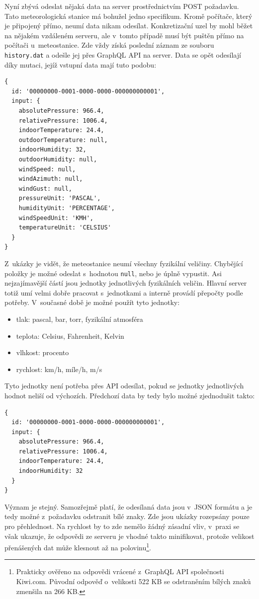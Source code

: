 Nyní zbývá odeslat nějaká data na server prostřednictvím POST po\-ža\-dav\-ku. Tato meteorologická stanice má bohužel jedno specifikum. Kromě počítače, který je připojený přímo, neumí data nikam odesílat. Konkretizační uzel by mohl běžet na nějakém vzdáleném serveru, ale v~tomto případě musí být puštěn přímo na počítači u~meteostanice. Zde vždy získá poslední záznam ze souboru \texttt{history.dat} a odešle jej přes GraphQL API na server. Data se opět odesílají díky mutaci, jejíž vstupní data mají tuto podobu:

\begin{verbatim}
{
  id: '00000000-0001-0000-0000-000000000001',
  input: {
    absolutePressure: 966.4,
    relativePressure: 1006.4,
    indoorTemperature: 24.4,
    outdoorTemperature: null,
    indoorHumidity: 32,
    outdoorHumidity: null,
    windSpeed: null,
    windAzimuth: null,
    windGust: null,
    pressureUnit: 'PASCAL',
    humidityUnit: 'PERCENTAGE',
    windSpeedUnit: 'KMH',
    temperatureUnit: 'CELSIUS'
  }
}
\end{verbatim}

Z~ukázky je vidět, že meteostanice neumí všechny fyzikální veličiny. Chy\-bě\-jí\-cí položky je možné odeslat s~hodnotou \texttt{null}, nebo je úplně vypustit. Asi nejzajímavější částí jsou jednotky jednotlivých fyzikálních veličin. Hlavní server totiž umí velmi dobře pracovat s~jednotkami a interně provádí přepočty podle potřeby. V~současné době je možné použít tyto jednotky:

\begin{itemize}
\item tlak: pascal, bar, torr, fyzikální atmosféra
\item teplota: Celsius, Fahrenheit, Kelvin
\item vlhkost: procento
\item rychlost: km/h, míle/h, m/s
\end{itemize}

Tyto jednotky není potřeba přes API odesílat, pokud se jednotky jednotlivých hodnot neliší od výchozích. Předchozí data by tedy bylo možné zjednodušit takto:

\begin{verbatim}
{
  id: '00000000-0001-0000-0000-000000000001',
  input: {
    absolutePressure: 966.4,
    relativePressure: 1006.4,
    indoorTemperature: 24.4,
    indoorHumidity: 32
  }
}
\end{verbatim}

Význam je stejný. Samozřejmě platí, že odesílaná data jsou v~JSON formátu a je tedy možné z~požadavku odstranit bílé znaky. Zde jsou ukázky rozepsány pouze pro přehlednost. Na rychlost by to zde nemělo žádný zásadní vliv, v~praxi se však ukazuje, že odpovědi ze serveru je vhodné takto minifikovat, protože velikost přenášených dat může klesnout až na polovinu\footnote{Prakticky ověřeno na odpovědi vrácené z~GraphQL API společnosti Kiwi.com. Původní odpověď o~velikosti 522 KB se odstraněním bílých znaků zmenšila na 266 KB.}.

